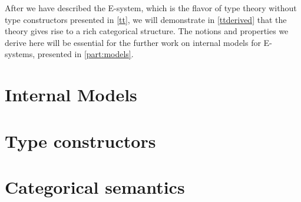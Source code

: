 \documentclass{article}
\begin{document}
After we have described the E-system, which is the flavor of type theory without
type constructors presented in \autoref{tt}, we will demonstrate in \autoref{ttderived}
that the theory gives rise to a rich categorical structure. The notions and
properties we derive here will be essential for the further work on internal
models for E-systems, presented in \autoref{part:models}.





\part{Internal Models}\label{part:models}



\part{Type constructors}







\part{Categorical semantics}





\end{document}
